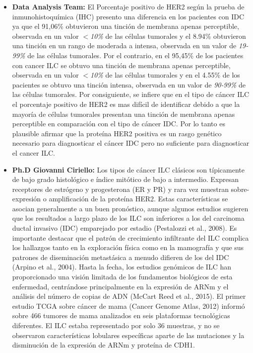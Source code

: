 \clearpage
{}

\begin{itemize}[label=\PencilRightDown]
	\item \textbf{Data Analysis Team:} El Porcentaje positivo de HER2 según la prueba de inmunohistoquímica (IHC) presento una diferencia en los pacientes con IDC ya que el 91,06\%  obtuvieron una tinción de membrana apenas perceptible, observada en un valor $<$\textit{10\%} de las células tumorales y el 8.94\% obtuvieron una tinción en un rango de moderada a intensa, observada en un valor de \textit{19-99\%} de las células tumorales. Por el contrario, en el 95,45\% de los pacientes con cancer ILC se obtuvo una tinción de membrana apenas perceptible, observada en un valor $<$\textit{10\%} de las células tumorales y en el 4.55\% de los pacientes se obtuvo una tinción intensa, observada en un valor de \textit{90-99\%} de las células tumorales. Por consiguiente, se infiere que en el tipo de cáncer ILC el porcentaje positivo de HER2 es mas difícil de identificar debido a que la mayoría de células tumorales presentan una tinción de membrana apenas perceptible en comparación con el tipo de cáncer IDC. Por lo tanto es plausible afirmar que la proteína HER2 positiva es un rasgo genético necesario para diagnosticar el cáncer IDC pero no suficiente para diagnosticar el cancer ILC.
			
	\item \textbf{Ph.D Giovanni Ciriello:} Los tipos de cáncer ILC clásicos son típicamente de bajo grado histológico e índice mitótico de bajo a intermedio. Expresan receptores de estrógeno y progesterona (ER y PR) y rara vez muestran sobre-expresión o amplificación de la proteína HER2. Estas características se asocian generalmente a un buen pronóstico, aunque algunos estudios sugieren que los resultados a largo plazo de los ILC son inferiores a los del carcinoma ductal invasivo (IDC) emparejado por estadio (Pestalozzi et al., 2008). Es importante destacar que el patrón de crecimiento infiltrante del ILC complica los hallazgos tanto en la exploración física como en la mamografía y que sus patrones de diseminación metastásica a menudo difieren de los del IDC (Arpino et al., 2004). Hasta la fecha, los estudios genómicos de ILC han proporcionado una visión limitada de los fundamentos biológicos de esta enfermedad, centrándose principalmente en la expresión de ARNm y el análisis del número de copias de ADN (McCart Reed et al., 2015). El primer estudio TCGA sobre cáncer de mama (Cancer Genome Atlas, 2012) informó sobre 466 tumores de mama analizados en seis plataformas tecnológicas diferentes. El ILC estaba representado por solo 36 muestras, y no se observaron características lobulares específicas aparte de las mutaciones y la disminución de la expresión de ARNm y proteína de CDH1\cite{Ciriello2015}. 
	
\end{itemize}

